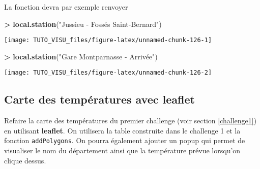 \documentclass[]{book}
\newenvironment{Shaded}{\begin{snugshade}}{\end{snugshade}}
\newcommand{\KeywordTok}[1]{\textcolor[rgb]{0.13,0.29,0.53}{\textbf{#1}}}
\newcommand{\NormalTok}[1]{#1}
\newcommand{\OperatorTok}[1]{\textcolor[rgb]{0.81,0.36,0.00}{\textbf{#1}}}
\newcommand{\StringTok}[1]{\textcolor[rgb]{0.31,0.60,0.02}{#1}}
\theoremstyle{definition}
\theoremstyle{definition}
\theoremstyle{definition}
\theoremstyle{remark}
\let\BeginKnitrBlock\begin \let\EndKnitrBlock\end
\begin{document}
La fonction devra par exemple renvoyer

\begin{Shaded}
\begin{Highlighting}[]
\OperatorTok{>}\StringTok{ }\KeywordTok{local.station}\NormalTok{(}\StringTok{"Jussieu - Fossés Saint-Bernard"}\NormalTok{)}
\end{Highlighting}
\end{Shaded}

\begin{center}\texttt{[image: TUTO\_VISU\_files/figure-latex/unnamed-chunk-126-1]} \end{center}

\begin{Shaded}
\begin{Highlighting}[]
\OperatorTok{>}\StringTok{ }\KeywordTok{local.station}\NormalTok{(}\StringTok{"Gare Montparnasse - Arrivée"}\NormalTok{)}
\end{Highlighting}
\end{Shaded}

\begin{center}\texttt{[image: TUTO\_VISU\_files/figure-latex/unnamed-chunk-126-2]} \end{center}

\hypertarget{carte-des-tempuxe9ratures-avec-leaflet}{%
\subsection{Carte des températures avec leaflet}\label{carte-des-tempuxe9ratures-avec-leaflet}}

\BeginKnitrBlock{exercise}[Challenge]
\protect\hypertarget{exr:ggplot-challenge}{}{\label{exr:ggplot-challenge} \iffalse (Challenge) \fi{} }

Refaire la carte des températures du premier challenge (voir section \ref{challenge1}) en utilisant \textbf{leaflet}. On utilisera la table construite dans le challenge 1 et la fonction \texttt{addPolygons}. On pourra également ajouter un popup qui permet de visualiser le nom du département ainsi que la température prévue lorsqu'on clique dessus.
\EndKnitrBlock{exercise}
\end{document}
